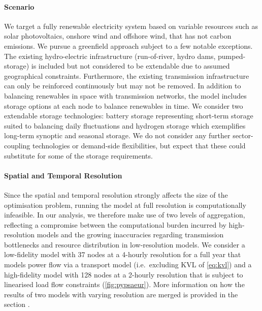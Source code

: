 \paragraph{Scenario}
We target a fully renewable electricity system based on variable resources such
as solar photovoltaics, onshore wind and offshore wind, that has not carbon
emissions. We pursue a greenfield approach subject to a few notable exceptions.
The existing hydro-electric infrastructure (run-of-river, hydro dams,
pumped-storage) is included but not considered to be extendable due to assumed
geographical constraints. Furthermore, the existing transmission infrastructure
can only be reinforced continuously but may not be removed. In addition to
balancing renewables in space with transmission networks, the model includes
storage options at each node to balance renewables in time. We consider two
extendable storage technologies: battery storage representing short-term storage
suited to balancing daily fluctuations and hydrogen storage which exemplifies
long-term synoptic and seasonal storage. We do not consider any further
sector-coupling technologies or demand-side flexibilities, but expect that these
could substitute for some of the storage requirements.

\paragraph{Spatial and Temporal Resolution}
Since the spatial and temporal resolution strongly affects the size of the
optimisation problem, running the model at full resolution is computationally
infeasible. In our analysis, we therefore make use of two levels of aggregation,
reflecting a compromise between the computational burden incurred by
high-resolution models and the growing inaccuracies regarding transmission
bottlenecks and resource distribution in low-resolution models. We consider a
low-fidelity model with 37 nodes at a 4-hourly resolution for a full year that
models power flow via a transport model (i.e.~excluding KVL of \cref{eq:kvl})
and a high-fidelity model with 128 nodes at a 2-hourly resolution that is
subject to linearised load flow constraints (\cref{fig:pypsaeur}). More
information on how the results of two models with varying resolution are merged
is provided in the section .


